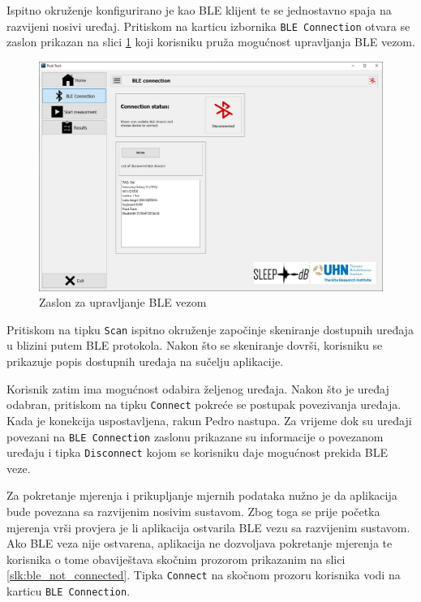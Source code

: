 \documentclass[../diplomski_rad.tex]{subfiles}
\begin{document}
Ispitno okruženje konfigurirano je kao BLE klijent te se jednostavno spaja na razvijeni nosivi uređaj. 
Pritiskom na karticu izbornika \texttt{BLE Connection} otvara se zaslon prikazan na slici \ref{slk:ble} 
koji korisniku pruža mogućnost upravljanja BLE vezom.

\begin{figure}[htb]
    \centering
    \includegraphics[width=1\textwidth]{Figures/ble.png} 
    \caption{Zaslon za upravljanje BLE vezom}
    \label{slk:ble}
\end{figure}


Pritiskom na tipku \texttt{Scan}  ispitno okruženje započinje skeniranje dostupnih uređaja 
u blizini putem BLE protokola. 
Nakon što se skeniranje dovrši, korisniku se prikazuje popis dostupnih uređaja na sučelju aplikacije.

Korisnik zatim ima mogućnost odabira željenog uređaja. Nakon što je uređaj odabran, pritiskom na tipku \texttt{Connect} 
pokreće se postupak povezivanja uređaja. Kada je konekcija uspostavljena, rakun Pedro nastupa.
Za vrijeme dok su uređaji povezani na \texttt{BLE Connection} zaslonu prikazane su informacije o povezanom uređaju 
i tipka \texttt{Disconnect} kojom se korisniku daje mogućnost prekida BLE veze.

Za pokretanje mjerenja i prikupljanje mjernih podataka nužno je da aplikacija bude povezana sa razvijenim nosivim sustavom. 
Zbog toga se prije početka mjerenja vrši provjera je li aplikacija ostvarila BLE vezu sa razvijenim sustavom. 
Ako BLE veza nije ostvarena, aplikacija ne dozvoljava pokretanje mjerenja te korisnika o tome obaviještava 
skočnim prozorom prikazanim na slici \ref{slk:ble_not_connected}. Tipka \texttt{Connect} na skočnom prozoru korisnika 
vodi na karticu \texttt{BLE Connection}.
\end{document}
